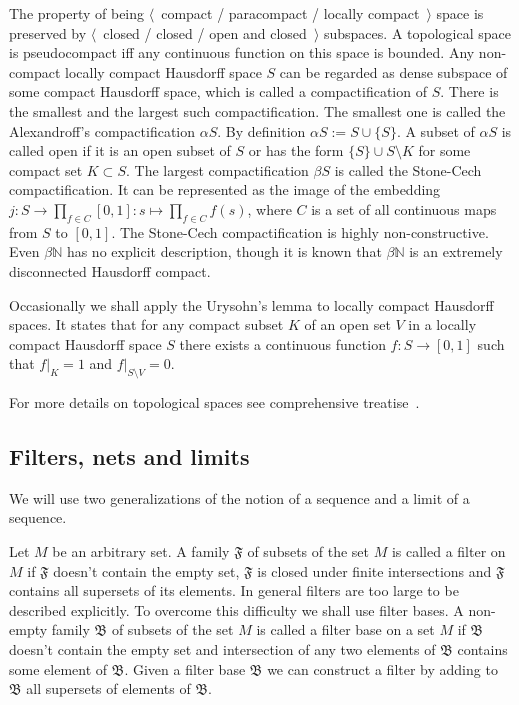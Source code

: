 The property of being $\langle$~compact / paracompact / locally
compact~$\rangle$ space is preserved by $\langle$~closed / closed / open and
closed~$\rangle$ subspaces. A topological space is pseudocompact iff any
continuous function on this space is bounded. Any non-compact locally compact
Hausdorff space $S$ can be regarded as dense subspace of some compact Hausdorff
space, which is called a compactification of $S$. There is the smallest and 
the largest such compactification. The smallest
one is called the Alexandroff's compactification $\alpha S$.  By definition
$\alpha S:=S\cup  \{S \}$. A subset of $\alpha S$ is called open if it is an
open subset of $S$ or has the form $ \{S \}\cup S\setminus K$ for some compact
set $K\subset S$. The largest compactification $\beta S$ is called the
Stone-Cech compactification. It can be represented as the image of the embedding
$j:S\to\prod_{f\in C}[0,1]:s\mapsto \prod_{f\in C}f(s)$, where $C$ is a set of
all continuous maps from $S$ to $[0,1]$. The Stone-Cech compactification is highly
non-constructive. Even $\beta\mathbb{N}$ has no explicit description, though it
is known that $\beta\mathbb{N}$ is an extremely disconnected Hausdorff compact.

Occasionally we shall apply the Urysohn's lemma to locally compact Hausdorff
spaces. It states that for any compact subset $K$ of an open set $V$ in a locally
compact Hausdorff space $S$ there exists a continuous function $f:S\to [0,1]$
such that $f|_K=1$ and $f|_{S\setminus V}=0$. 

For more details on topological spaces see comprehensive
treatise~\cite{EngelGenTop}. 


\subsection{
  Filters, nets and limits}\label{SubSectionFiltersNetsAndLimits} 

We will use two generalizations of the notion of a sequence and a limit of
a sequence.

Let $M$ be an arbitrary set. A family $\mathfrak{F}$ of subsets of the set $M$ 
is called a filter on $M$ if $\mathfrak{F}$ doesn't contain the empty set, 
$\mathfrak{F}$ is closed under finite intersections and $\mathfrak{F}$ contains 
all supersets of its elements. In general filters are too large to be described 
explicitly. To overcome this difficulty we shall use filter bases. A non-empty 
family $\mathfrak{B}$ of subsets of the set $M$ is called a filter base on 
a set $M$ if $\mathfrak{B}$ doesn't contain the empty set and intersection of 
any two elements of $\mathfrak{B}$ contains some element of $\mathfrak{B}$. 
Given a filter base $\mathfrak{B}$ we can construct a filter by adding 
to $\mathfrak{B}$ all supersets of elements of $\mathfrak{B}$.

